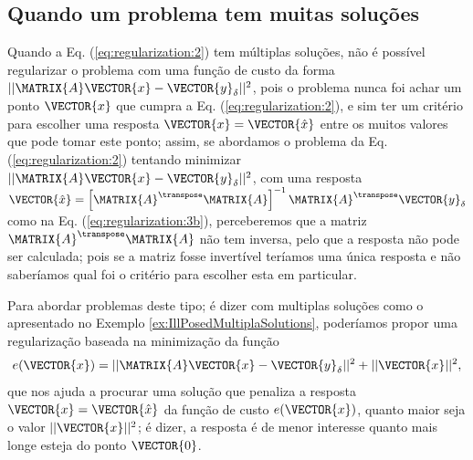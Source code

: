\subsection{Quando um problema \illposed tem muitas soluções}
Quando a Eq. (\ref{eq:regularization:2}) tem múltiplas soluções, 
não é possível regularizar o problema com uma função de custo da forma 
$||\MATRIX{A}\VECTOR{x}-\VECTOR{y}_{\delta}||^2$,
pois o problema nunca foi achar um ponto $\VECTOR{x}$ que cumpra a Eq. (\ref{eq:regularization:2}), 
e sim ter um critério para escolher uma resposta $\VECTOR{x}=\VECTOR{\hat{x}}$ entre os muitos valores que pode tomar este ponto;
assim, se abordamos o problema da Eq. (\ref{eq:regularization:2}) tentando minimizar $||\MATRIX{A}\VECTOR{x}-\VECTOR{y}_{\delta}||^2$,
com uma resposta $\VECTOR{\hat{x}} = \left[ \MATRIX{A}^{\transpose} \MATRIX{A} \right]^{-1}\MATRIX{A}^{\transpose}\VECTOR{y}_{\delta}$
como na Eq. (\ref{eq:regularization:3b}),
perceberemos que a matriz $\MATRIX{A}^{\transpose}\MATRIX{A}$ não tem inversa,
pelo que a resposta não pode ser calculada;
pois se a matriz fosse invertível teríamos uma única resposta e não saberíamos
qual foi o critério para escolher esta em particular.

Para abordar problemas deste tipo; é dizer com multiplas soluções
como o apresentado no Exemplo \ref{ex:IllPosedMultiplaSolutions}, 
poderíamos propor uma regularização baseada na minimização
da função 
\begin{equation}\label{eq:regularization:4}
e(\VECTOR{x})=||\MATRIX{A}\VECTOR{x}-\VECTOR{y}_{\delta}||^2+||\VECTOR{x}||^2,
\end{equation}
que nos ajuda a procurar uma solução que penaliza a resposta $\VECTOR{x}=\VECTOR{\hat{x}}$ da função de custo $e(\VECTOR{x})$, 
quanto maior seja o valor $||\VECTOR{x}||^2$;
é dizer, a resposta é de menor interesse quanto mais longe esteja do ponto $\VECTOR{0}$.


